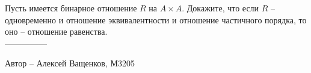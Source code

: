 \question
Пусть имеется бинарное отношение $R$ на $ A \times A$. Докажите, что если $R$ -- одновременно и отношение эквивалентности и отношение частичного порядка, то оно -- отношение равенства.
\\
---------------

Автор -- Алексей Ващенков, М3205